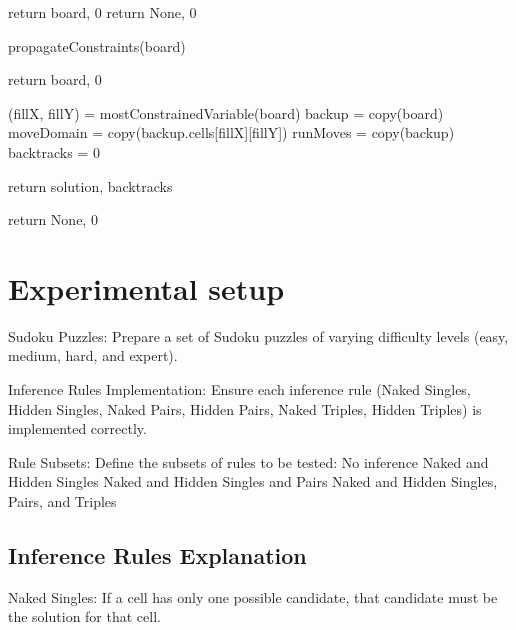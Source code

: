 \documentclass{article}
\begin{document}
  \begin{algorithmic}
    \State return board, 0  
  \EndIf
    \State return None, 0   
  \EndIf
       
  \State propagateConstraints(board)

    \State return board, 0   
  \EndIf
  

  \State (fillX, fillY) = mostConstrainedVariable(board)
  \State backup = copy(board)
  \State moveDomain = copy(backup.cells[fillX][fillY])
  \State runMoves = copy(backup)
  \State backtracks = 0



      \EndIf



      \EndIf



      \State return solution, backtracks
      \EndIf

      \EndFor
  \State return None, 0           
    
         \end{algorithmic}
 \label{alg:Backtracking Search}
 

 
 

\section{Experimental setup}
Sudoku Puzzles: Prepare a set of Sudoku puzzles of varying difficulty levels (easy, medium, hard, and expert).

Inference Rules Implementation: Ensure each inference rule (Naked Singles, Hidden Singles, Naked Pairs, Hidden Pairs, Naked Triples, Hidden Triples) is implemented correctly.

Rule Subsets: Define the subsets of rules to be tested:
No inference
Naked and Hidden Singles
Naked and Hidden Singles and Pairs
Naked and Hidden Singles, Pairs, and Triples
\subsection{Inference Rules Explanation
}
{Naked Singles: If a cell has only one possible candidate, that candidate must be the solution for that cell.}
\end{document}
